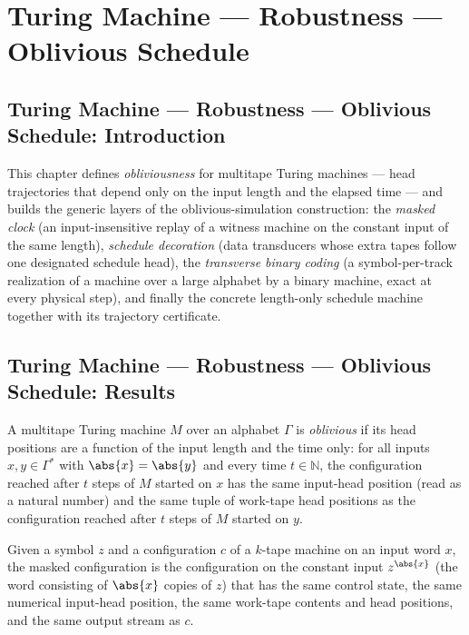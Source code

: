 \section{Turing Machine --- Robustness --- Oblivious Schedule}
\subsection*{Turing Machine --- Robustness --- Oblivious Schedule: Introduction}

This chapter defines \emph{obliviousness} for multitape Turing machines — head
trajectories that depend only on the input length and the elapsed time — and builds
the generic layers of the oblivious-simulation construction: the \emph{masked clock}
(an input-insensitive replay of a witness machine on the constant input of the same
length), \emph{schedule decoration} (data transducers whose extra tapes follow one
designated schedule head), the \emph{transverse binary coding} (a symbol-per-track
realization of a machine over a large alphabet by a binary machine, exact at every
physical step), and finally the concrete length-only schedule machine together with
its trajectory certificate.

\subsection*{Turing Machine --- Robustness --- Oblivious Schedule: Results}

\begin{definition}
\label{Turing.FinTM.Oblivious}
\leanok
{}
A multitape Turing machine $M$ over an alphabet $\Gamma$ is \emph{oblivious} if its
head positions are a function of the input length and the time only: for all inputs
$x, y \in \Gamma^*$ with $\abs{x} = \abs{y}$ and every time $t \in \mathbb{N}$, the
configuration reached after $t$ steps of $M$ started on $x$ has the same input-head
position (read as a natural number) and the same tuple of work-tape head positions
as the configuration reached after $t$ steps of $M$ started on $y$.
\end{definition}

\begin{definition}
\label{Complexity.maskedCfg}
\leanok
{}
Given a symbol $z$ and a configuration $c$ of a $k$-tape machine on an input word
$x$, the masked configuration is the configuration on the constant input
$z^{\abs{x}}$ (the word consisting of $\abs{x}$ copies of $z$) that has the same
control state, the same numerical input-head position, the same work-tape contents
and head positions, and the same output stream as $c$.
\end{definition}

